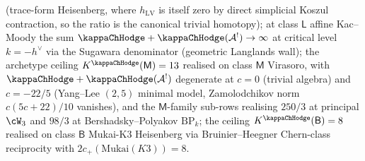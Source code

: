 \begin{proposition}
\begin{enumerate}[label=\textup{(\alph*)}]
(trace-form Heisenberg, where $h_{\mathrm{LV}}$ is itself zero by
direct simplicial Koszul contraction, so the ratio is the
canonical trivial homotopy); at class $\mathsf L$ affine
Kac--Moody the sum $\kappaChHodge+\kappaChHodge(\cA^!)\to\infty$ at critical level
$k=-h^{\vee}$ via the Sugawara denominator (geometric Langlands
wall); the archetype ceiling $K^{\kappaChHodge}(\mathsf M)=13$ realised on
class $\mathsf M$ Virasoro, with $\kappaChHodge+\kappaChHodge(\cA^!)$ degenerate
at $c=0$ (trivial algebra) and $c=-22/5$ (Yang--Lee $(2,5)$
minimal model, Zamolodchikov norm $c(5c+22)/10$ vanishes), and the
$\mathsf M$-family sub-rows realising $250/3$ at principal $\cW_3$
and $98/3$ at Bershadsky--Polyakov $\mathrm{BP}_k$; the
ceiling $K^{\kappaChHodge}(\mathsf B)=8$ realised on class $\mathsf B$
Mukai-K3 Heisenberg via Bruinier--Heegner Chern-class reciprocity
with $2c_{+}(\mathrm{Mukai}(K3))=8$.
\end{enumerate}
\end{proposition}

